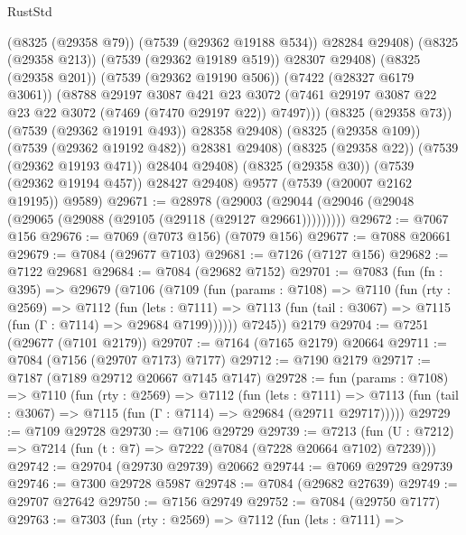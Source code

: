 \begin{lexlean}{RustStd}
\begin{coremodule}
                    (@8325 (@29358 @79))
                    (@7539 (@29362 @19188 @534))
                    @28284
                    @29408)
                  (@8325 (@29358 @213))
                  (@7539 (@29362 @19189 @519))
                  @28307
                  @29408)
                (@8325 (@29358 @201))
                (@7539 (@29362 @19190 @506))
                (@7422 (@28327 @6179 @3061))
                (@8788
                  @29197
                  @3087
                  @421
                  @23
                  @3072
                  (@7461 @29197 @3087 @22 @23 @22 @3072 (@7469 (@7470 @29197 @22)) @7497)))
              (@8325 (@29358 @73))
              (@7539 (@29362 @19191 @493))
              @28358
              @29408)
            (@8325 (@29358 @109))
            (@7539 (@29362 @19192 @482))
            @28381
            @29408)
          (@8325 (@29358 @22))
          (@7539 (@29362 @19193 @471))
          @28404
          @29408)
        (@8325 (@29358 @30))
        (@7539 (@29362 @19194 @457))
        @28427
        @29408)
      @9577
      (@7539 (@20007 @2162 @19195))
      @9589)
@29671 := @28978
    (@29003 (@29044 (@29046 (@29048 (@29065 (@29088 (@29105 (@29118 (@29127 @29661)))))))))
@29672 := @7067 @156
@29676 := @7069 (@7073 @156) (@7079 @156)
@29677 := @7088 @20661
@29679 := @7084 (@29677 @7103)
@29681 := @7126 (@7127 @156)
@29682 := @7122 @29681
@29684 := @7084 (@29682 @7152)
@29701 := @7083
    (fun (fn : @395) =>
    @29679
      (@7106
        (@7109
          (fun (params : @7108) =>
          @7110
            (fun (rty : @2569) =>
            @7112
              (fun (lets : @7111) =>
              @7113 (fun (tail : @3067) => @7115 (fun (Γ : @7114) => @29684 @7199))))))
        @7245))
    @2179
@29704 := @7251 (@29677 (@7101 @2179))
@29707 := @7164 (@7165 @2179) @20664
@29711 := @7084 (@7156 (@29707 @7173) @7177)
@29712 := @7190 @2179
@29717 := @7187 (@7189 @29712 @20667 @7145 @7147)
@29728 := fun (params : @7108) =>
  @7110
    (fun (rty : @2569) =>
    @7112
      (fun (lets : @7111) =>
      @7113 (fun (tail : @3067) => @7115 (fun (Γ : @7114) => @29684 (@29711 @29717)))))
@29729 := @7109 @29728
@29730 := @7106 @29729
@29739 := @7213
    (fun (U : @7212) => @7214 (fun (t : @7) => @7222 (@7084 (@7228 @20664 @7102) @7239)))
@29742 := @29704 (@29730 @29739) @20662
@29744 := @7069 @29729 @29739
@29746 := @7300 @29728 @5987
@29748 := @7084 (@29682 @27639)
@29749 := @29707 @27642
@29750 := @7156 @29749
@29752 := @7084 (@29750 @7177)
@29763 := @7303
    (fun (rty : @2569) =>
    @7112
      (fun (lets : @7111) =>

\end{coremodule}
\end{lexlean}
